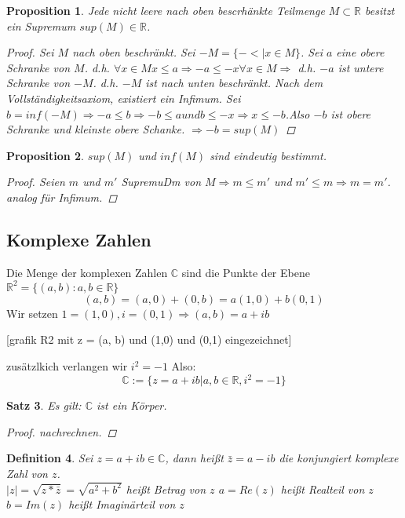 \documentclass[a4paper,titlepage,oneside]{article}
\def\C{\ensuremath{\mathbb{C}} }
\def\R{\ensuremath{\mathbb{R}} }
\def\im{\ensuremath{\mathit{i}} }
\newcommand{\fa}[1]{\ensuremath{\forall#1}}
\newcommand{\abs}[1]{\ensuremath{\left|#1\right|}}
\theoremstyle{thmstyle}
\newtheorem{satz}{Satz}[subsection]
\newtheorem{prop}[satz]{Proposition}
\newtheorem{defi}[satz]{Definition}
\begin{document}
\begin{prop}
Jede nicht leere nach oben bescrhänkte Teilmenge $M \subset \R$ besitzt ein Supremum $sup(M) \in \R$.
\begin{proof}
Sei $M$ nach oben beschränkt. Sei $-M = \{-< | x \in M\}$. Sei $a$ eine obere Schranke von $M$. d.h. $\fa x \in M  x \le a \Rightarrow -a \le -x \fa x \in M \Rightarrow $ d.h. $-a$ ist untere Schranke von $-M$. d.h. $-M$ ist nach unten beschränkt. Nach dem Vollständigkeitsaxiom, existiert ein Infimum. Sei $b= inf(-M) \Rightarrow -a \le b \Rightarrow -b \le a und b \le -x \Rightarrow x \le -b$.Also $-b$ ist obere Schranke und kleinste obere Schanke. $ \Rightarrow -b = sup(M)$ 
\end{proof}
\end{prop}

\begin{prop}
$sup(M)$ und $inf(M)$ sind eindeutig bestimmt.
\begin{proof}
Seien $m$ und $m'$ SupremuDm von $M \Rightarrow m \le m'$ und $m' \le m \Rightarrow m = m'$.\\
analog für Infimum.
\end{proof}
\end{prop}

\subsection{Komplexe Zahlen}
Die Menge der komplexen Zahlen \C sind die Punkte der Ebene \(\R^2 = \{(a,b) : a,b \in \R\}\)
\[(a,b) = (a, 0) + (0, b) = a (1,0) + b (0, 1)\]
Wir setzen \(1 = (1,0), \im = (0,1) \Rightarrow (a, b) = a + \im b\)

[grafik R2 mit z = (a, b) und (1,0) und (0,1) eingezeichnet]  %

zusätzlkich verlangen wir \(\im^2 = -1\) Also: \[\C := \{z = a + \im b | a, b \in \R, \im^2 = -1 \}\]

\begin{satz}
Es gilt:  \C ist ein Körper.
\begin{proof} nachrechnen. \end{proof} %
\end{satz}

\begin{defi}
Sei \( z = a + \im b \in \C \), dann heißt \(\bar{z} = a - \im b \) die konjungiert komplexe Zahl von $z$. \\
\(\abs{z} = \sqrt{z * \bar{z}} = \sqrt{a^2 + b^2}\) heißt Betrag von \(z\)
$a = Re(z)$ heißt Realteil von $z$
$b = Im(z)$ heißt Imaginärteil von $z$
\end{defi}
\end{document}
